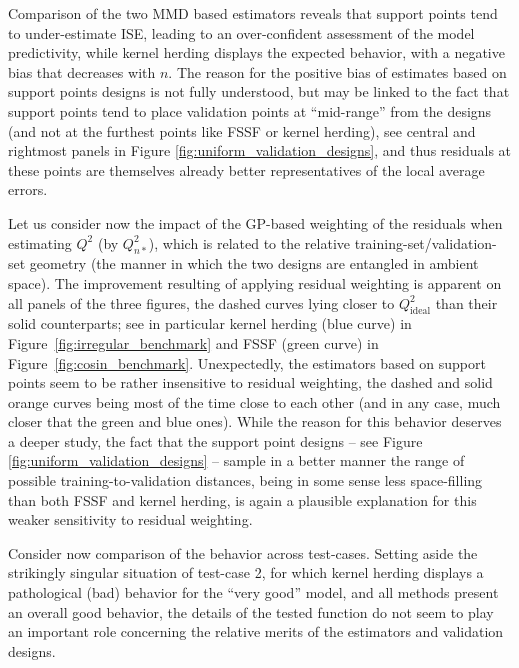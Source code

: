 Comparison of the two MMD based estimators reveals that support points tend to under-estimate ISE, leading to an over-confident assessment of the model predictivity, while kernel herding displays the expected behavior, with a negative bias that decreases with $n$. 
The reason for the positive bias of estimates based on support points designs is not fully understood, but may be linked to the fact that support points tend to place validation points at ``mid-range'' from the designs (and not at the furthest points like FSSF or kernel herding), see central and rightmost panels in Figure \ref{fig:uniform_validation_designs}, and thus residuals at these points are themselves already better representatives of the local average errors. 

Let us consider now the impact of the GP-based weighting of the residuals when estimating $Q^2$ (by $Q_{n*}^2$), which is related to the relative training-set/validation-set geometry (the manner in which the two designs are entangled in ambient space). 
The improvement resulting of applying residual weighting is apparent on all panels of the three figures, the dashed curves lying closer to $Q_{\mathrm{ideal}}^2$ than their solid counterparts; see in particular kernel herding (blue curve) in Figure~\ref{fig:irregular_benchmark} and FSSF (green curve) in Figure~\ref{fig:cosin_benchmark}. 
Unexpectedly, the estimators based on support points seem to be rather insensitive to residual weighting, the dashed and solid orange curves being most of the time close to each other (and in any case, much closer that the green and blue ones). 
While the reason for this behavior deserves a deeper study, the fact that the support point designs -- see Figure \ref{fig:uniform_validation_designs} -- sample in a better manner the range of possible training-to-validation distances, being in some sense less space-filling than both FSSF and kernel herding, is again a plausible explanation for this weaker sensitivity to residual weighting.


Consider now comparison of the behavior across test-cases. 
Setting aside the strikingly singular situation of test-case 2, for which kernel herding displays a pathological (bad) behavior for the ``very good'' model, 
and all methods present an overall good behavior, 
the details of the tested function do not seem to play an important role concerning the relative merits of the estimators and validation designs.

